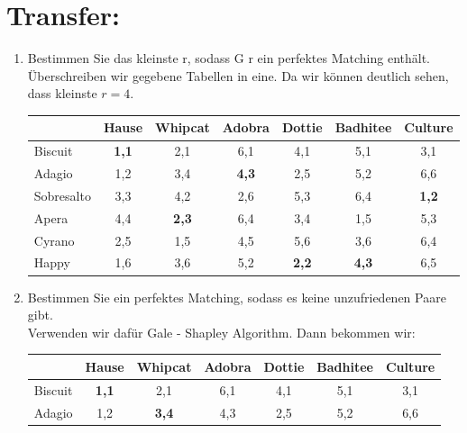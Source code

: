     \section*{Transfer:}
    \begin{enumerate}[label=(\alph*)]
    	\item Bestimmen Sie das kleinste r, sodass G r ein perfektes Matching enthält.\\
        Überschreiben wir gegebene Tabellen in eine. Da wir können deutlich sehen, dass kleinste $r=4$. %
        \begin{table}
            \begin{tabular}{|l|c|c|c|c|c|c|}
            \hline
            ~          & Hause     & Whipcat   & Adobra    & Dottie    & Badhitee  & Culture   \\ \hline
            Biscuit    & {\bf 1,1} & 2,1       & 6,1       & 4,1       & 5,1       & 3,1       \\ \hline
            Adagio     & 1,2       & 3,4       & {\bf 4,3} & 2,5       & 5,2       & 6,6       \\ \hline
            Sobresalto & 3,3       & 4,2       & 2,6       & 5,3       & 6,4       & {\bf 1,2} \\ \hline
            Apera      & 4,4       & {\bf 2,3} & 6,4       & 3,4       & 1,5       & 5,3       \\ \hline
            Cyrano     & 2,5       & 1,5       & 4,5       & 5,6       & 3,6       & 6,4       \\ \hline
            Happy      & 1,6       & 3,6       & 5,2       & {\bf 2,2} & {\bf 4,3} & 6,5       \\ \hline
            \end{tabular}
        \end{table}
        \item Bestimmen Sie ein perfektes Matching, sodass es keine unzufriedenen Paare gibt.\\
        Verwenden wir dafür Gale - Shapley Algorithm. Dann bekommen wir:
        \begin{table}
            \begin{tabular}{|l|c|c|c|c|c|c|}
            \hline
            ~          & Hause     & Whipcat   & Adobra   & Dottie   & Badhitee   & Culture   \\ \hline
            Biscuit    & {\bf 1,1} & 2,1       & 6,1      & 4,1      & 5,1        & 3,1       \\ \hline
            Adagio     & 1,2       & {\bf3,4}  & 4,3      & 2,5      & 5,2        & 6,6       \\ \hline

\end{tabular}
\end{table}
\end{enumerate}
